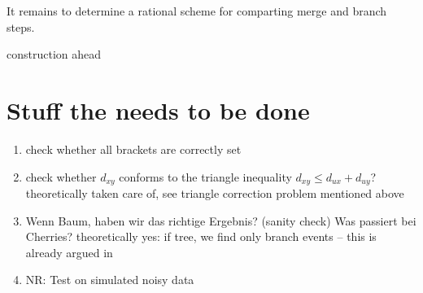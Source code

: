 \documentclass{article}
\newcommand{\TODO}[1]{\begingroup\color{red}#1\endgroup}
\newcommand{\PFS}[1]{\begingroup\color{green}#1\endgroup}
\begin{document}
It remains to determine a rational scheme for comparting merge and branch
steps.

\TODO{construction ahead} 

\section{Stuff the needs to be done} 

\begin{enumerate}
 \item \TODO{check whether all brackets are correctly set} 
 \item \TODO{check whether $d_{xy}$ conforms to the triangle inequality
     $d_{xy} \leq d_{ux} + d_{uy}$?}  \PFS{theoretically taken care of, see
     triangle correction problem mentioned above}
 \item \TODO{Wenn Baum, haben wir das richtige Ergebnis? (sanity check) 
     Was passiert bei Cherries?} 
   \PFS{theoretically yes: if tree, we find only branch events -- this is 
     already argued in \cite{Prohaska:17a}}
 \item \TODO{NR: Test on simulated noisy data} \\
\end{enumerate}


      
   
\end{document}
